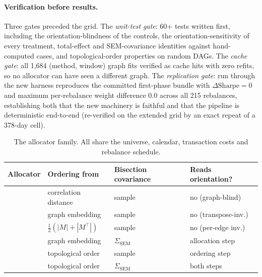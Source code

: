 \paragraph{Verification before results.} Three gates preceded the grid.
The \emph{unit-test gate}: 60+ tests written first, including the
orientation-blindness of the controls, the orientation-sensitivity of every
treatment, total-effect and SEM-covariance identities against
hand-computed cases, and topological-order properties on random
DAGs. The \emph{cache gate}: all 1,684 (method, window) graph fits
verified
as cache hits with zero refits, so no allocator can have seen a different
graph. The \emph{replication gate}: \skelsamp{} run through the new
harness reproduces
the committed first-phase bundle with $\Delta\text{Sharpe}=0$ and
maximum per-rebalance weight difference $0.0$ across all 215 rebalances,
establishing both that the new machinery is faithful and that
the pipeline is deterministic end-to-end (re-verified on the extended grid
by an exact repeat of a 378-day cell).

\begin{table}[t]
  \centering
  \caption{The allocator family. All share
    the universe, calendar, transaction costs and rebalance schedule.}
  \label{tab:variants}
  \small
  \setlength{\tabcolsep}{4.5pt}
  \begin{tabular}{l l l l}
    \toprule
    Allocator & Ordering from & Bisection covariance & Reads orientation? \\
    \midrule
    \HRP{} & correlation distance & sample & no (graph-blind) \\
    \skelsamp{}            & graph embedding      & sample & no (transpose-inv.) \\
    \skelalt{}           & $\tfrac{1}{2}(|M|{+}|M^\top|)$ & sample & no (per-edge inv.) \\
    \skelsem{}            & graph embedding      & $\Sigma_{\mathrm{SEM}}$ & allocation step \\
    \orientsamp{}            & topological order    & sample & ordering step \\
    \orientsem{}           & topological order    & $\Sigma_{\mathrm{SEM}}$ & both steps \\
    \bottomrule
  \end{tabular}
\end{table}
